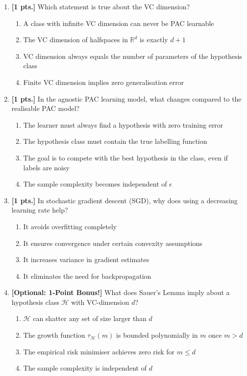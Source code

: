 \documentclass[11pt,a4paper]{article}
\begin{document}
\begin{enumerate}[label=\textbf{\arabic*.}]
    \item \textbf{[1 pts.]} Which statement is true about the VC dimension?
    \begin{enumerate}[label=(\alph*)]
        \item A class with infinite VC dimension can never be PAC learnable
        \item The VC dimension of halfspaces in $\mathbb{R}^d$ is exactly $d + 1$
        \item VC dimension always equals the number of parameters of the hypothesis class
        \item Finite VC dimension implies zero generalisation error
    \end{enumerate}

    \item \textbf{[1 pts.]} In the agnostic PAC learning model, what changes compared to the realisable PAC model?
    \begin{enumerate}[label=(\alph*)]
        \item The learner must always find a hypothesis with zero training error
        \item The hypothesis class must contain the true labelling function
        \item The goal is to compete with the best hypothesis in the class, even if labels are noisy
        \item The sample complexity becomes independent of $\epsilon$
    \end{enumerate}

    \item \textbf{[1 pts.]} In stochastic gradient descent (SGD), why does using a decreasing learning rate help?
    \begin{enumerate}[label=(\alph*)]
        \item It avoids overfitting completely
        \item It ensures convergence under certain convexity assumptions
        \item It increases variance in gradient estimates
        \item It eliminates the need for backpropagation
    \end{enumerate}

    \item \textbf{[Optional: 1-Point Bonus!]} What does Sauer's Lemma imply about a hypothesis class $\mathcal{H}$ with VC-dimension $d$?
    \begin{enumerate}[label=(\alph*)]
        \item $\mathcal{H}$ can shatter any set of size larger than $d$
        \item The growth function $\tau_{\mathcal{H}}(m)$ is bounded polynomially in $m$ once $m > d$
        \item The empirical risk minimiser achieves zero risk for $m \le d$
        \item The sample complexity is independent of $d$
    \end{enumerate}
\end{enumerate}
\end{document}
